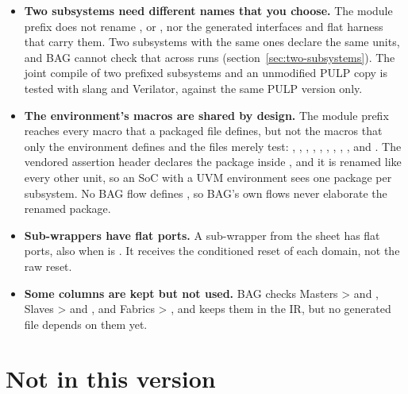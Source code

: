\begin{itemize}
\item \textbf{Two subsystems need different names that you choose.} The module prefix does
  not rename ,  or , nor the generated interfaces and flat harness that carry them. Two subsystems
  with the same ones declare the same units, and BAG cannot check that across runs
  (section~\ref{sec:two-subsystems}). The joint compile of two prefixed subsystems and an
  unmodified PULP copy is tested with slang and Verilator, against the same PULP version
  only.
\item \textbf{The environment's macros are shared by design.} The module prefix reaches
  every macro that a packaged file defines, but not the macros that only the environment
  defines and the files merely test: , , ,
  , , , , ,
  ,  and .
  The vendored assertion header declares the package  inside
  , and it is renamed like every other unit, so an SoC with a UVM
  environment sees one package per subsystem. No BAG flow defines , so BAG's own
  flows never elaborate the renamed package.
\item \textbf{Sub-wrappers have flat ports.} A sub-wrapper from the 
  sheet has flat ports, also when  is . It receives
  the conditioned reset of each domain, not the raw reset.
\item \textbf{Some columns are kept but not used.} BAG checks
  Masters >  and , Slaves >
   and , and Fabrics > , and keeps
  them in the IR, but no generated file depends on them yet.
\end{itemize}

\section{Not in this version}

